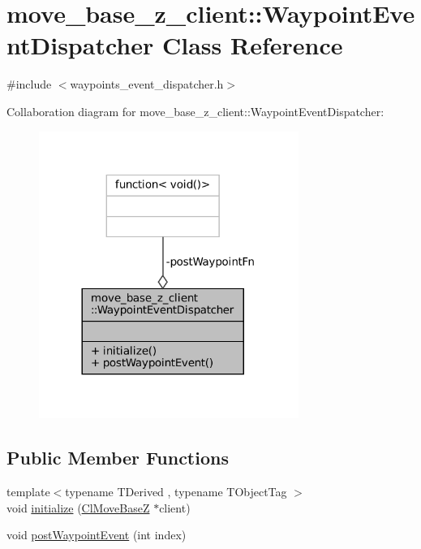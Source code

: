 \hypertarget{classmove__base__z__client_1_1WaypointEventDispatcher}{}\section{move\+\_\+base\+\_\+z\+\_\+client\+:\+:Waypoint\+Event\+Dispatcher Class Reference}
\label{classmove__base__z__client_1_1WaypointEventDispatcher}


{\ttfamily \#include $<$waypoints\+\_\+event\+\_\+dispatcher.\+h$>$}



Collaboration diagram for move\+\_\+base\+\_\+z\+\_\+client\+:\+:Waypoint\+Event\+Dispatcher\+:
\nopagebreak
\begin{figure}[H]
\begin{center}
\leavevmode
\includegraphics[width=240pt]{classmove__base__z__client_1_1WaypointEventDispatcher__coll__graph}
\end{center}
\end{figure}
\subsection*{Public Member Functions}
\begin{DoxyCompactItemize}
\item 
{\footnotesize template$<$typename T\+Derived , typename T\+Object\+Tag $>$ }\\void \hyperlink{classmove__base__z__client_1_1WaypointEventDispatcher_a70fc3a92c59e40648f350f3912d736ae}{initialize} (\hyperlink{classmove__base__z__client_1_1ClMoveBaseZ}{Cl\+Move\+BaseZ} $\ast$client)
\item 
void \hyperlink{classmove__base__z__client_1_1WaypointEventDispatcher_a7421f1eb8aae15a3ddde7c50bea87648}{post\+Waypoint\+Event} (int index)
\end{DoxyCompactItemize}
